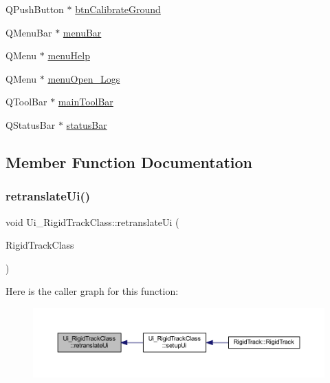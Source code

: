 \begin{DoxyCompactItemize}
\item 
Q\+Push\+Button $\ast$ \hyperlink{class_ui___rigid_track_class_a7497d27bfd5a03243079fdb055291264}{btn\+Calibrate\+Ground}
\item 
Q\+Menu\+Bar $\ast$ \hyperlink{class_ui___rigid_track_class_ae5991e1872fe74ac542cf0fdca8d4d0e}{menu\+Bar}
\item 
Q\+Menu $\ast$ \hyperlink{class_ui___rigid_track_class_a2df43c6bb7db7e366a64bc8dbbbab7cc}{menu\+Help}
\item 
Q\+Menu $\ast$ \hyperlink{class_ui___rigid_track_class_a1df91ff9df043558cf6d3c1dd6557250}{menu\+Open\+\_\+\+Logs}
\item 
Q\+Tool\+Bar $\ast$ \hyperlink{class_ui___rigid_track_class_abb7105788d67491618ebd4229964f992}{main\+Tool\+Bar}
\item 
Q\+Status\+Bar $\ast$ \hyperlink{class_ui___rigid_track_class_ac1ced4ae725bc0095307704d5d4fc4f2}{status\+Bar}
\end{DoxyCompactItemize}


\subsection{Member Function Documentation}
\mbox{\label{class_ui___rigid_track_class_a7c96951c4e173848e7695d6bd7883af6}} 
\subsubsection{\texorpdfstring{retranslate\+Ui()}{retranslateUi()}}
{\footnotesize\ttfamily void Ui\+\_\+\+Rigid\+Track\+Class\+::retranslate\+Ui (\begin{DoxyParamCaption}\item[{Q\+Main\+Window $\ast$}]{Rigid\+Track\+Class }\end{DoxyParamCaption})\hspace{0.3cm}{\ttfamily [inline]}}

Here is the caller graph for this function\+:
\nopagebreak
\begin{figure}[H]
\begin{center}
\leavevmode
\includegraphics[width=350pt]{class_ui___rigid_track_class_a7c96951c4e173848e7695d6bd7883af6_icgraph}
\end{center}
\end{figure}
\mbox{\label{class_ui___rigid_track_class_a7f78fefc15716049b873bef4d3450e38}} 
